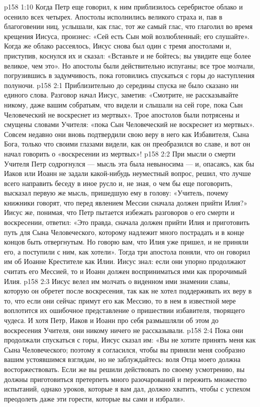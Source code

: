 \vs p158 1:10 Когда Петр еще говорил, к ним приблизилось серебристое облако и осенило всех четырех. Апостолы исполнились великого страха и, пав в благоговении ниц, услышали, как глас, тот же самый глас, что глаголил во время крещения Иисуса, произнес: «Сей есть Сын мой возлюбленный; его слушайте». Когда же облако рассеялось, Иисус снова был один с тремя апостолами и, приступив, коснулся их и сказал: «Встаньте и не бойтесь; вы увидите еще более великое, чем это». Но апостолы были действительно испуганы; все трое молчали, погрузившись в задумчивость, пока готовились спускаться с горы до наступления полуночи.
\vs p158 2:1 Приблизительно до середины спуска не было сказано ни единого слова. Разговор начал Иисус, заметив: «Смотрите, не рассказывайте никому, даже вашим собратьям, что видели и слышали на сей горе, пока Сын Человеческий не воскреснет из мертвых». Трое апостолов были потрясены и смущены словами Учителя: «пока Сын Человеческий не воскреснет из мертвых». Совсем недавно они вновь подтвердили свою веру в него как Избавителя, Сына Бога, только что своими глазами видели, как он преобразился во славе, и вот он начал говорить о «воскресении из мертвых»!
\vs p158 2:2 При мысли о смерти Учителя Петр содрогнулся --- мысль эта была невыносима --- и, опасаясь, как бы Иаков или Иоанн не задали какой\hyp{}нибудь неуместный вопрос, решил, что лучше всего направить беседу в иное русло и, не зная, о чем бы еще поговорить, высказал первую же мысль, пришедшую ему в голову: «Учитель, почему книжники говорят, что перед явлением Мессии сначала должен прийти Илия?» Иисус же, понимая, что Петр пытается избежать разговоров о его смерти и воскресении, ответил: «Это правда, сначала должен прийти Илия и приготовить путь для Сына Человеческого, которому надлежит много пострадать и в конце концов быть отвергнутым. Но говорю вам, что Илия уже пришел, и не приняли его, а поступили с ним, как хотели». Тогда три апостола поняли, что он говорил им об Иоанне Крестителе как Илии. Иисус знал: если они упорно продолжают считать его Мессией, то и Иоанн должен восприниматься ими как пророчимый Илия.
\vs p158 2:3 Иисус велел им молчать о виденном ими знамении славы, которую он обретет после воскресения, так как не хотел поддерживать их веру в то, что если они сейчас примут его как Мессию, то в нем в известной мере воплотится их ошибочное представление о пришествии избавителя, творящего чудеса. И хотя Петр, Иаков и Иоанн про себя размышляли об этом до воскресения Учителя, они никому ничего не рассказывали.
\vs p158 2:4 Пока они продолжали спускаться с горы, Иисус сказал им: «Вы не хотите принять меня как Сына Человеческого; поэтому я согласился, чтобы вы приняли меня сообразно вашим устоявшимся взглядам, но не заблуждайтесь: воля Отца моего должна восторжествовать. Если же вы решили действовать по своему усмотрению, вы должны приготовиться претерпеть много разочарований и пережить множество испытаний, однако уроков, которые я вам дал, должно хватить, чтобы с успехом преодолеть даже эти горести, которые вы сами и избрали».
